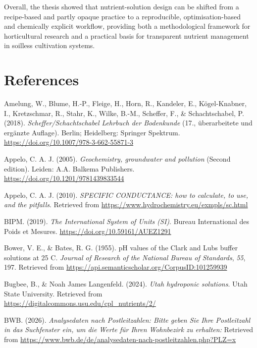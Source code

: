 \documentclass[
  letterpaper,
  DIV=11,
  numbers=noendperiod]{scrreprt}
\newlength{\cslhangindent}
\newenvironment{CSLReferences}[2] %
 {\begin{list}{}{%
  \setlength{\itemindent}{0pt}
  \setlength{\leftmargin}{0pt}
  \setlength{\parsep}{0pt}
  \ifodd #1
   \setlength{\leftmargin}{\cslhangindent}
   \setlength{\itemindent}{-1\cslhangindent}
  \fi
  \setlength{\itemsep}{#2\baselineskip}}}
 {\end{list}}
\begin{document}
Overall, the thesis showed that nutrient-solution design can be shifted
from a recipe-based and partly opaque practice to a reproducible,
optimisation-based and chemically explicit workflow, providing both a
methodological framework for horticultural research and a practical
basis for transparent nutrient management in soilless cultivation
systems.

\chapter{References}\label{references}

\label{refs}
\begin{CSLReferences}{1}{0}
Amelung, W., Blume, H.-P., Fleige, H., Horn, R., Kandeler, E.,
Kögel-Knabner, I., Kretzschmar, R., Stahr, K., Wilke, B.-M., Scheffer,
F., \& Schachtschabel, P. (2018). \emph{{Scheffer/Schachtschabel
Lehrbuch der Bodenkunde}} (17., {ü}berarbeitete und erg{ä}nzte Auflage).
Berlin; Heidelberg: {Springer Spektrum}.
\url{https://doi.org/10.1007/978-3-662-55871-3}

Appelo, C. A. J. (2005). \emph{{Geochemistry, groundwater and
pollution}} (Second edition). Leiden: {A.A. Balkema Publishers}.
\url{https://doi.org/10.1201/9781439833544}

Appelo, C. A. J. (2010). \emph{{SPECIFIC CONDUCTANCE: how to calculate,
to use, and the pitfalls}}. Retrieved from
\url{https://www.hydrochemistry.eu/exmpls/sc.html}

BIPM. (2019). \emph{{The International System of Units (SI)}}. {Bureau
International des Poids et Mesures}.
\url{https://doi.org/10.59161/AUEZ1291}

Bower, V. E., \& Bates, R. G. (1955). {pH values of the Clark and Lubs
buffer solutions at 25 C}. \emph{{Journal of Research of the National
Bureau of Standards}}, \emph{55}, 197. Retrieved from
\url{https://api.semanticscholar.org/CorpusID:101259939}

Bugbee, B., \& Noah James Langenfeld. (2024). \emph{{Utah hydroponic
solutions}}. {Utah State University}. Retrieved from
\url{https://digitalcommons.usu.edu/cpl_nutrients/2/}

BWB. (2026). \emph{{Analysedaten nach Postleitzahlen: Bitte geben Sie
Ihre Postleitzahl in das Suchfenster ein, um die Werte f{ü}r Ihren
Wohnbezirk zu erhalten:}} Retrieved from
\url{https://www.bwb.de/de/analysedaten-nach-postleitzahlen.php?PLZ=x}


\end{CSLReferences}
\end{document}
